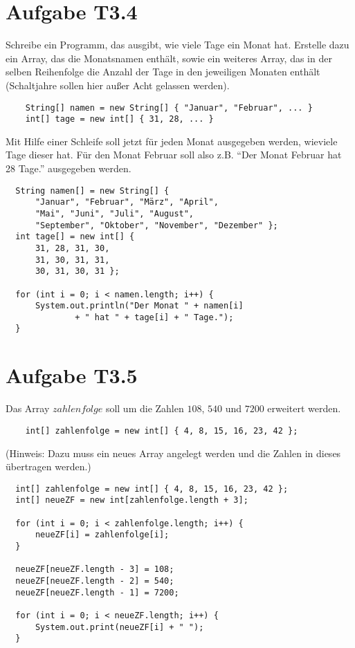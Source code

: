 \documentclass[final,a4paper]{article}
\begin{document}
\section*{Aufgabe T3.4}
	Schreibe ein Programm, das ausgibt, wie viele Tage ein Monat hat. Erstelle dazu ein Array,
	das die Monatsnamen enthält, sowie ein weiteres Array, das in der selben Reihenfolge die Anzahl
	der Tage in den jeweiligen Monaten enthält (Schaltjahre sollen hier außer Acht gelassen werden).
	\begin{lstlisting}
	String[] namen = new String[] { "Januar", "Februar", ... }
	int[] tage = new int[] { 31, 28, ... }
	\end{lstlisting}
	Mit Hilfe einer Schleife soll jetzt für jeden Monat ausgegeben werden, wieviele Tage dieser hat.
	Für den Monat Februar soll also z.B. "`Der Monat Februar hat 28 Tage."' ausgegeben werden.

	\begin{lstlisting}
  String namen[] = new String[] {
	  "Januar", "Februar", "März", "April",
	  "Mai", "Juni", "Juli", "August",
	  "September", "Oktober", "November", "Dezember" };
  int tage[] = new int[] {
	  31, 28, 31, 30,
	  31, 30, 31, 31,
	  30, 31, 30, 31 };

  for (int i = 0; i < namen.length; i++) {
	  System.out.println("Der Monat " + namen[i]
			  + " hat " + tage[i] + " Tage.");
  }
	\end{lstlisting}

\section*{Aufgabe T3.5}
	Das Array $zahlenfolge$ soll um die Zahlen $108$, $540$ und $7200$ erweitert werden.
	\begin{lstlisting}
	int[] zahlenfolge = new int[] { 4, 8, 15, 16, 23, 42 };
	\end{lstlisting}
	(Hinweis: Dazu muss ein neues Array angelegt werden und die Zahlen in dieses übertragen werden.)

	\begin{lstlisting}
  int[] zahlenfolge = new int[] { 4, 8, 15, 16, 23, 42 };
  int[] neueZF = new int[zahlenfolge.length + 3];

  for (int i = 0; i < zahlenfolge.length; i++) {
	  neueZF[i] = zahlenfolge[i];
  }

  neueZF[neueZF.length - 3] = 108;
  neueZF[neueZF.length - 2] = 540;
  neueZF[neueZF.length - 1] = 7200;

  for (int i = 0; i < neueZF.length; i++) {
	  System.out.print(neueZF[i] + " ");
  }
	\end{lstlisting}
\end{document}
